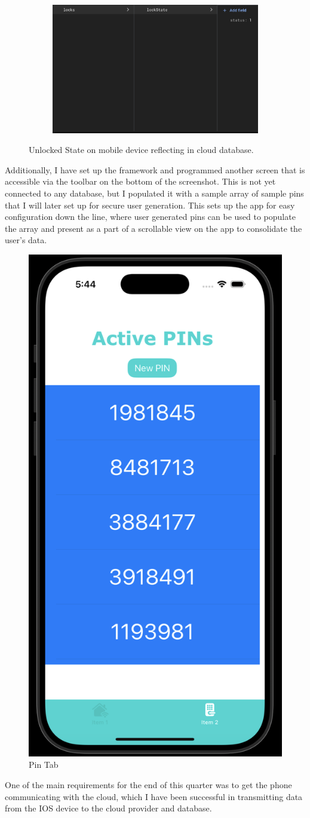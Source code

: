\begin{figure}[h]
\begin{subfigure}{0.3\textwidth}
         \caption{}
         \label{fig:1a}
     \end{subfigure}
     \begin{subfigure}{0.6\textwidth}
         \centering
         \includegraphics[width=\linewidth]{./img/lockState.png}
         \caption{}
         \label{fig:1b}
     \end{subfigure}
     \caption{Unlocked State on mobile device reflecting in cloud database.}
     \label{fig:1}
\end{figure}
\newpage
Additionally, I have set up the framework and programmed another screen that is accessible via the toolbar on the bottom of the screenshot. This is not yet connected to any database, but I populated it with a sample array of sample pins that I will later set up for secure user generation. This sets up the app for easy configuration down the line, where user generated pins can be used to populate the array and present as a part of a scrollable view on the app to consolidate the user's data.

\begin{figure}[htbp]
    \centering
    \includegraphics[width=0.185 \linewidth]{./img/pinPage.png}
    \caption{Pin Tab}
    \label{fig:pin}
\end{figure}
One of the main requirements for the end of this quarter was to get the phone communicating with the cloud, which I have been successful in transmitting data from the IOS device to the cloud provider and database.

